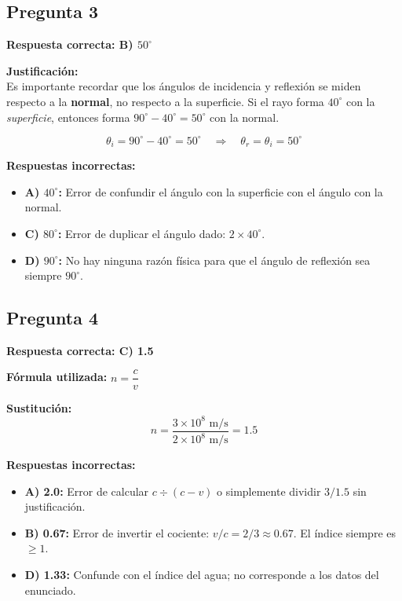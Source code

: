 \begin{respuestabox}
\subsection*{Pregunta 3}
\textcolor{verdecorrecto}{\textbf{Respuesta correcta: B) $50^\circ$}}

\textbf{Justificación:}\\
Es importante recordar que los ángulos de incidencia y reflexión se miden respecto a la \textbf{normal}, no respecto a la superficie. Si el rayo forma $40^\circ$ con la \textit{superficie}, entonces forma $90^\circ - 40^\circ = 50^\circ$ con la normal.

$$\theta_i = 90^\circ - 40^\circ = 50^\circ \quad \Rightarrow \quad \theta_r = \theta_i = 50^\circ$$

\textbf{Respuestas incorrectas:}
\begin{itemize}
    \item \textbf{A) $40^\circ$:} Error de confundir el ángulo con la superficie con el ángulo con la normal.
    \item \textbf{C) $80^\circ$:} Error de duplicar el ángulo dado: $2 \times 40^\circ$.
    \item \textbf{D) $90^\circ$:} No hay ninguna razón física para que el ángulo de reflexión sea siempre $90^\circ$.
\end{itemize}
\end{respuestabox}
\newpage
\begin{respuestabox}
\subsection*{Pregunta 4}
\textcolor{verdecorrecto}{\textbf{Respuesta correcta: C) 1.5}}

\textbf{Fórmula utilizada:} $n = \dfrac{c}{v}$

\textbf{Sustitución:}
$$n = \frac{3 \times 10^8 \text{ m/s}}{2 \times 10^8 \text{ m/s}} = 1.5$$

\textbf{Respuestas incorrectas:}
\begin{itemize}
    \item \textbf{A) 2.0:} Error de calcular $c \div (c - v)$ o simplemente dividir $3/1.5$ sin justificación.
    \item \textbf{B) 0.67:} Error de invertir el cociente: $v/c = 2/3 \approx 0.67$. El índice siempre es $\geq 1$.
    \item \textbf{D) 1.33:} Confunde con el índice del agua; no corresponde a los datos del enunciado.
\end{itemize}
\end{respuestabox}

